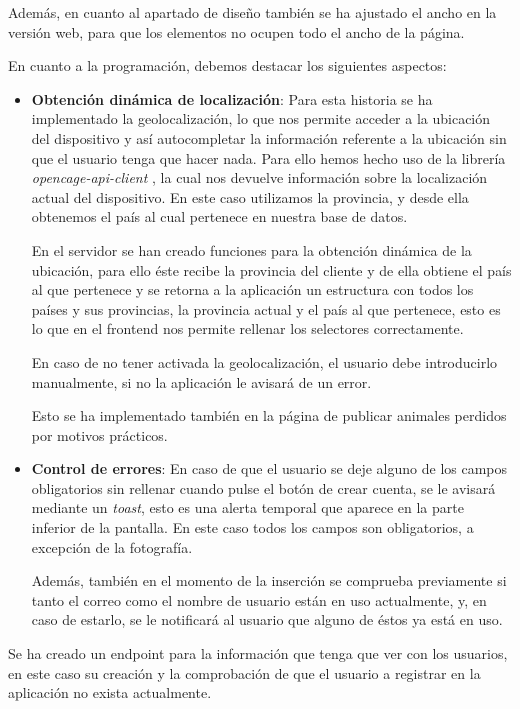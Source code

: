 Además, en cuanto al apartado de diseño también se ha ajustado el ancho en la versión web, para que los elementos no ocupen todo el ancho de la página.

En cuanto a la programación, debemos destacar los siguientes aspectos:

\begin{itemize}
	\item \textbf{Obtención dinámica de localización}: Para esta historia se ha implementado la geolocalización, lo que nos permite acceder a la ubicación del dispositivo y así autocompletar la información referente a la ubicación sin que el usuario tenga que hacer nada. Para ello hemos hecho uso de la librería \textit{opencage-api-client} \cite{geoapi}, la cual nos devuelve información sobre la localización actual del dispositivo. En este caso utilizamos la provincia, y desde ella obtenemos el país al cual pertenece en nuestra base de datos. 
	
	En el servidor se han creado funciones para la obtención dinámica de la ubicación, para ello éste recibe la provincia del cliente y de ella obtiene el país al que pertenece y se retorna a la aplicación un estructura con todos los países y sus provincias, la provincia actual y el país al que pertenece, esto es lo que en el frontend nos permite rellenar los selectores correctamente.
	
	En caso de no tener activada la geolocalización, el usuario debe introducirlo manualmente, si no la aplicación le avisará de un error.
	
	Esto se ha implementado también en la página de publicar animales perdidos por motivos prácticos.
	
	
	\item \textbf{Control de errores}: En caso de que el usuario se deje alguno de los campos obligatorios sin rellenar cuando pulse el botón de crear cuenta, se le avisará mediante un \textit{toast}, esto es una alerta temporal que aparece en la parte inferior de la pantalla. En este caso todos los campos son obligatorios, a excepción de la fotografía.
	
	Además, también en el momento de la inserción se comprueba previamente si tanto el correo como el nombre de usuario están en uso actualmente, y, en caso de estarlo, se le notificará al usuario que alguno de éstos ya está en uso.
\end{itemize}

Se ha creado un endpoint para la información que tenga que ver con los usuarios, en este caso su creación y la comprobación de que el usuario a registrar en la aplicación no exista actualmente.

